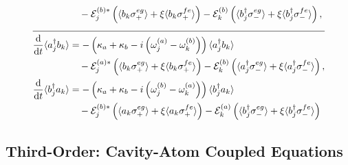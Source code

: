 \documentclass{article}
\newcommand{\ddt}[1][]{\frac{\mathrm{d} #1}{\mathrm{d}t}}
\begin{document}
\begin{subequations}
\begin{align}
		&\quad - \mathcal{E}_{j}^{(b) *} \left( \langle b_{k} \sigma^{eg}_{+} \rangle + \xi \langle b_{k} \sigma^{fe}_{+} \rangle \right)- \mathcal{E}_{k}^{(b)} \left( \langle b_{j}^{\dagger} \sigma^{eg}_{-} \rangle + \xi \langle b_{j}^{\dagger} \sigma^{fe}_{-} \rangle \right), \\
		\cline{1-2}
		\ddt \langle a^{\dagger}_{j} b_{k} \rangle &= -\left( \kappa_{a} + \kappa_{b} - i \left( \omega_{j}^{(a)}- \omega_{k}^{(b)} \right) \right) \langle a^{\dagger}_{j} b_{k} \rangle \nonumber \\
		&\quad - \mathcal{E}_{j}^{(a) *} \left( \langle b_{k} \sigma^{eg}_{+} \rangle + \xi \langle b_{k} \sigma^{fe}_{+} \rangle \right)- \mathcal{E}_{k}^{(b)} \left( \langle a_{j}^{\dagger} \sigma^{eg}_{-} \rangle + \xi \langle a_{j}^{\dagger} \sigma^{fe}_{-} \rangle \right), \\
		\ddt \langle b^{\dagger}_{j} a_{k} \rangle &= -\left( \kappa_{a} + \kappa_{b} - i \left( \omega_{j}^{(b)}- \omega_{k}^{(a)} \right) \right) \langle b^{\dagger}_{j} a_{k} \rangle \nonumber \\
		&\quad - \mathcal{E}_{j}^{(b) *} \left( \langle a_{k} \sigma^{eg}_{+} \rangle + \xi \langle a_{k} \sigma^{fe}_{+} \rangle \right)- \mathcal{E}_{k}^{(a)} \left( \langle b_{j}^{\dagger} \sigma^{eg}_{-} \rangle + \xi \langle b_{j}^{\dagger} \sigma^{fe}_{-} \rangle \right)
	\end{align}
\end{subequations}

\subsection{Third-Order: Cavity-Atom Coupled Equations}
\end{document}
